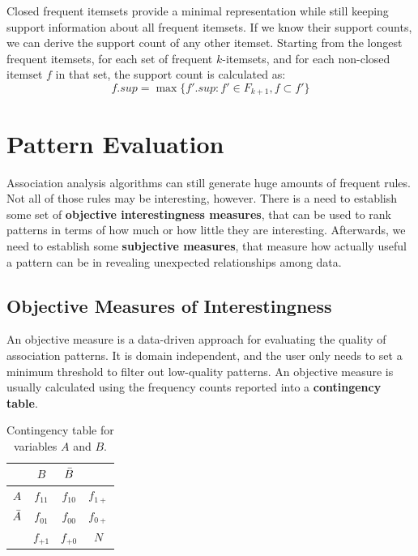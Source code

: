 Closed frequent itemsets provide a minimal representation while still keeping support information about all frequent itemsets. If we know their support counts, we can derive the support count of any other itemset. Starting from the longest frequent itemsets, for each set of frequent $k$-itemsets, and for each non-closed itemset $f$ in that set, the support count is calculated as:
\begin{equation*}
    f.sup = \max\{f'.sup : f' \in F_{k+1}, f \subset f'\}
\end{equation*}

\section{Pattern Evaluation}

Association analysis algorithms can still generate huge amounts of frequent rules. Not all of those rules may be interesting, however. There is a need to establish some set of \textbf{objective interestingness measures}, that can be used to rank patterns in terms of how much or how little they are interesting. Afterwards, we need to establish some \textbf{subjective measures}, that measure how actually useful a pattern can be in revealing unexpected relationships among data.

\subsection{Objective Measures of Interestingness}

An objective measure is a data-driven approach for evaluating the quality of association patterns. It is domain independent, and the user only needs to set a minimum threshold to filter out low-quality patterns. An objective measure is usually calculated using the frequency counts reported into a \textbf{contingency table}.

\begin{table}[h]
    \centering
    \begin{tabular}{c|ccc}
         & $B$ & $\Bar{B}$ & \\
        \hline
        $A$ & $f_{11}$ & $f_{10}$ & $f_{1+}$\\
        $\Bar{A}$ & $f_{01} $ & $f_{00}$ & $f_{0+}$\\
        & $f_{+1}$ & $f_{+0}$ & $N$ \\
    \end{tabular}
    \caption{Contingency table for variables $A$ and $B$.}
\end{table}

